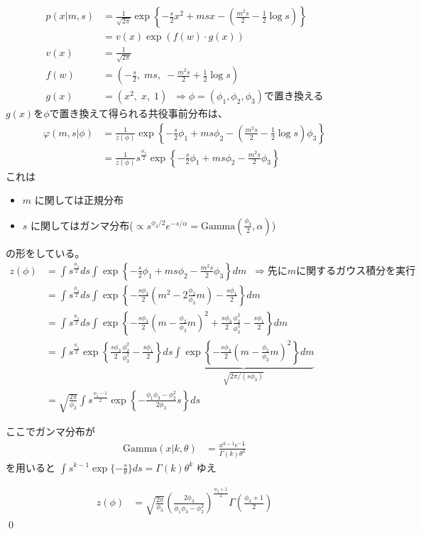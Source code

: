 \documentclass[dvipdfmx,11pt]{jsarticle}
\begin{document}
\begin{align*}
p(x|m,s) &= \frac1{\sqrt{2\pi}} \exp\left\{-\frac{s}{2}x^2 + msx - \left(\frac{m^2s}{2}-\frac12\log s\right) \right\} \\
&= v(x) \exp\left( f(w) \cdot g(x)\right) \\
v(x) &= \frac1{\sqrt{2\pi}} \\
f(w) &= \left(-\frac{s}{2}, \; ms, \; -\frac{m^2s}{2}+\frac12\log s \right) \\
g(x) &= \left(x^2, \; x, \; 1 \right) \;\; \Rightarrow \phi=(\phi_1, \phi_2, \phi_3) \text{で置き換える}
\end{align*}
$g(x)$を$\phi$で置き換えて得られる共役事前分布は、
\begin{align*}
\varphi(m,s|\phi) &= \frac1{z(\phi)} \exp\left\{-\frac{s}{2}\phi_1 + ms\phi_2 - \left(\frac{m^2s}{2}-\frac12\log s\right)\phi_3 \right\} \\
&= \frac1{z(\phi)} s^{\frac{\phi_3}2}\exp\left\{-\frac{s}{2}\phi_1 + ms\phi_2 - \frac{m^2s}{2}\phi_3 \right\} 
\end{align*}
これは
\begin{itemize}
\item $m$ に関しては正規分布
\item $s$ に関してはガンマ分布($\propto s^{\phi_3/2} e^{-s/\alpha} = \text{Gamma}(\frac{\phi_3}2, \alpha)$)
\end{itemize}
の形をしている。
\begin{align*}
z(\phi) &= \int s^{\frac{\phi_3}2} ds \int \exp\left\{-\frac{s}{2}\phi_1 + ms\phi_2 - \frac{m^2s}{2}\phi_3 \right\} dm \;\; \Rightarrow \text{先に}m\text{に関するガウス積分を実行} \\
&= \int s^{\frac{\phi_3}2} ds \int 
\exp\left\{-\frac{s\phi_3}2 \left(m^2 - 2 \frac{\phi_2}{\phi_3}m \right) -\frac{s\phi_1}2\right\} dm \\
&= \int s^{\frac{\phi_3}2} ds \int 
\exp\left\{-\frac{s\phi_3}2 \left(m - \frac{\phi_2}{\phi_3}m\right)^2 + \frac{s\phi_3}2\frac{\phi_2^2}{\phi_3^2} -\frac{s\phi_1}2\right\} dm \\
&= \int s^{\frac{\phi_3}2} \exp\left\{ \frac{s\phi_3}2\frac{\phi_2^2}{\phi_3^2} -\frac{s\phi_1}2 \right\} ds
\underbrace{\int \exp\left\{-\frac{s\phi_3}2 \left(m - \frac{\phi_2}{\phi_3}m\right)^2 \right\} dm}_{\sqrt{2\pi/(s\phi_3)}} \\
&= \sqrt{\frac{2\pi}{\phi_3}} \int s^{\frac{\phi_3-1}2} \exp\left\{-\frac{\phi_1\phi_3-\phi_2^2}{2\phi_3}s\right\} ds
\end{align*}

ここでガンマ分布が
\begin{align*}
\text{Gamma}(x|k,\theta) &= \frac{x^{k-1}e^{-\frac{x}\theta}}{\Gamma(k)\theta^k}
\end{align*}
を用いると $\int s^{k-1} \exp\{-\frac{s}\theta\}ds = \Gamma(k)\theta^k$ ゆえ

\begin{align*}
z(\phi) &= \sqrt{\frac{2\pi}{\phi_3}} \left(\frac{2\phi_3}{\phi_1\phi_3-\phi_2^2}\right)^{\frac{\phi_3+1}{2}} \Gamma(\frac{\phi_3+1}{2})
\end{align*}\qed
\end{document}
